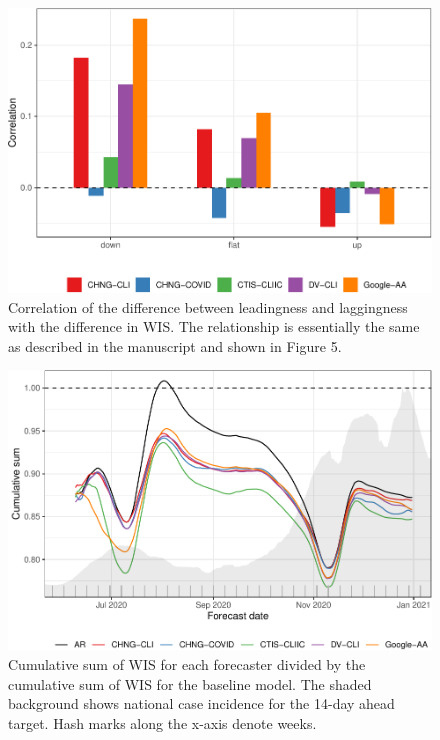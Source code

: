 \documentclass[9pt,twoside,lineno]{pnas-new}
\begin{document}
\clearpage

\begin{figure}

{\centering \includegraphics[width=\textwidth]{fig/diff-in-lead-lag-1} 

}

\caption{Correlation of the difference between leadingness and laggingness with the difference in WIS. The relationship is essentially the same as described in the manuscript and shown in Figure 5.}\label{fig:diff-in-lead-lag}
\end{figure}

\clearpage

\clearpage

\begin{figure}

{\centering \includegraphics[width=\textwidth]{fig/cumulative-mean-1} 

}

\caption{Cumulative sum of WIS for each forecaster divided by the cumulative sum of WIS for the baseline model. The shaded background shows national case incidence for the 14-day ahead target. Hash marks along the x-axis denote weeks.}\label{fig:cumulative-mean}
\end{figure}
\end{document}
